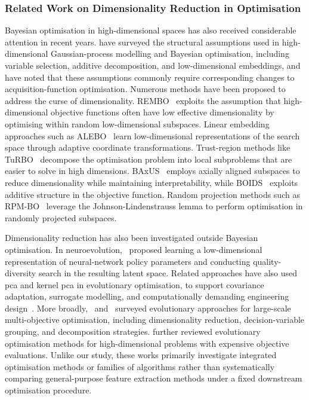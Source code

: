 \subsubsection{Related Work on Dimensionality Reduction in Optimisation}
\label{app:ch05:rel-work-dr-opt}
Bayesian optimisation in high-dimensional spaces has also received considerable attention in recent years. \citet{BinWyc22} have surveyed the structural assumptions used in high-dimensional Gaussian-process modelling and Bayesian optimisation, including variable selection, additive decomposition, and low-dimensional embeddings, and have noted that these assumptions commonly require corresponding changes to acquisition-function optimisation.
Numerous methods have been proposed to address the curse of dimensionality.
REMBO~\citep{WanEtAl16b} exploits the assumption that high-dimensional objective functions often have low effective dimensionality by optimising within random low-dimensional subspaces.
Linear embedding approaches such as ALEBO~\citep{LetEtAl20} learn low-dimensional representations of the search space through adaptive coordinate transformations.
Trust-region methods like TuRBO~\citep{EriEtAl19b} decompose the optimisation problem into local subproblems that are easier to solve in high dimensions.
BAxUS~\citep{PapEtAl22} employs axially aligned subspaces to reduce dimensionality while maintaining interpretability, while BOIDS~\citep{NgoEtAl25} exploits additive structure in the objective function.
Random projection methods such as RPM-BO~\citep{NguTra24} leverage the Johnson-Lindenstrauss lemma to perform optimisation in randomly projected subspaces.

Dimensionality reduction has also been investigated outside Bayesian optimisation.
In neuroevolution,~\citet{RakEtAl21} proposed learning a low-dimensional representation of neural-network policy parameters and conducting quality-diversity search in the resulting latent space.
Related approaches have also used \gls{pca} and kernel \gls{pca} in evolutionary optimisation, to support covariance adaptation, surrogate modelling, and computationally demanding engineering design~\citep{MeiWan21b,KapEtAl16,AbbEtAl20}.
More broadly,~\citet{HonEtAl21} and~\citet{TiaEtAl21b} surveyed evolutionary approaches for large-scale multi-objective optimisation, including dimensionality reduction, decision-variable grouping, and decomposition strategies.
\citet{ZhoEtAl24} further reviewed evolutionary optimisation methods for high-dimensional problems with expensive objective evaluations. Unlike our study, these works primarily investigate integrated optimisation methods or families of algorithms rather than systematically comparing general-purpose feature extraction methods under a fixed downstream optimisation procedure.

